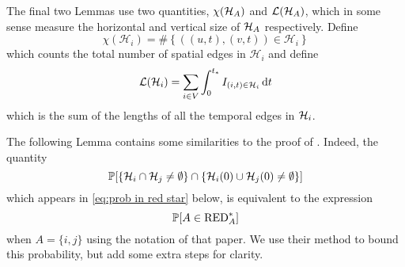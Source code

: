 	The final two Lemmas use two quantities, $\chi(\mathcal{H}_A)$ and $\mathcal{L}(\mathcal{H}_A)$, which in some sense measure the horizontal and vertical size of $\mathcal{H}_A$ respectively. 
	Define
	\begin{equation}
		\chi(\mathcal{H}_i) = \#\left\{ \left( (u,t), (v,t) \right) \in \mathcal{H}_i \right\}
	\end{equation}
	which counts the total number of spatial edges in $\mathcal{H}_i$ and define
	\begin{equation}
		\mathcal{L}(\mathcal{H}_i) = \sum_{i \in V} \int_{0}^{t_*} I_{(i, t) \in \mathcal{H}_i} \, \mathrm{d} t
	\end{equation}
	which is the sum of the lengths of all the temporal edges in $\mathcal{H}_i$. 

	The following Lemma contains some similarities to the proof of \cite[Lemma 2.1]{Lubetzky2015-po}. Indeed, the quantity 
	\begin{equation}
		\mathbb{P}[\left\{\mathcal{H}_i \cap \mathcal{H}_j \neq \emptyset\right\} \cap \left\{\mathcal{H}_i(0) \cup \mathcal{H}_j(0) \neq \emptyset\right\}]
	\end{equation}
	which appears in \eqref{eq:prob in red star} below, is equivalent to the  expression
	\begin{equation}
		\mathbb{P}[A \in \mathrm{RED}_A^*]
	\end{equation}
	when $A = \{i, j\}$ using the notation of that paper. We use their method to bound this probability, but add some extra steps for clarity.
	

